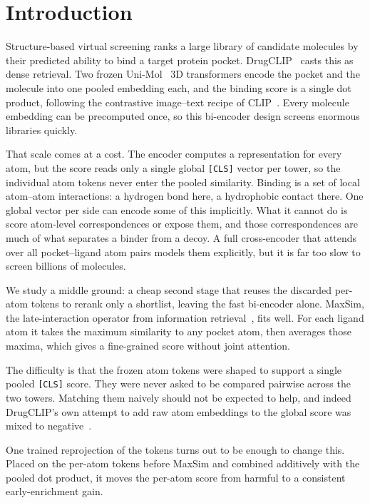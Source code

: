 \documentclass[10pt,letterpaper,twocolumn]{article}
\begin{document}
\section{Introduction}

Structure-based virtual screening ranks a large library of candidate molecules by their predicted ability to bind a target protein pocket. DrugCLIP~\cite{drugclip} casts this as dense retrieval. Two frozen Uni-Mol~\cite{unimol} 3D transformers encode the pocket and the molecule into one pooled embedding each, and the binding score is a single dot product, following the contrastive image--text recipe of CLIP~\cite{clip}. Every molecule embedding can be precomputed once, so this bi-encoder design screens enormous libraries quickly.

That scale comes at a cost. The encoder computes a representation for every atom, but the score reads only a single global \texttt{[CLS]} vector per tower, so the individual atom tokens never enter the pooled similarity. Binding is a set of local atom--atom interactions: a hydrogen bond here, a hydrophobic contact there. One global vector per side can encode some of this implicitly. What it cannot do is score atom-level correspondences or expose them, and those correspondences are much of what separates a binder from a decoy. A full cross-encoder that attends over all pocket--ligand atom pairs models them explicitly, but it is far too slow to screen billions of molecules.

We study a middle ground: a cheap second stage that reuses the discarded per-atom tokens to rerank only a shortlist, leaving the fast bi-encoder alone. MaxSim, the late-interaction operator from information retrieval~\cite{colbert,colbertv2}, fits well. For each ligand atom it takes the maximum similarity to any pocket atom, then averages those maxima, which gives a fine-grained score without joint attention.

The difficulty is that the frozen atom tokens were shaped to support a single pooled \texttt{[CLS]} score. They were never asked to be compared pairwise across the two towers. Matching them naively should not be expected to help, and indeed DrugCLIP's own attempt to add raw atom embeddings to the global score was mixed to negative~\cite{drugclip}.

One trained reprojection of the tokens turns out to be enough to change this. Placed on the per-atom tokens before MaxSim and combined additively with the pooled dot product, it moves the per-atom score from harmful to a consistent early-enrichment gain.
\end{document}
